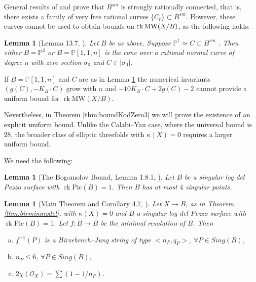 \documentclass[11pt]{amsart}
\newtheorem{lemma}[theorem]{Lemma}
\theoremstyle{definition}
\theoremstyle{definition}
\theoremstyle{remark}
\theoremstyle{remark}
\theoremstyle{definition}
\theoremstyle{conjecture}
\newcommand{\MW}{\mathrm{MW}}
\newcommand{\Pic}{\mathrm{Pic}}
\begin{document}
 
General results of \cite[Thm. 6.5]{XuSRC2012}  and \cite[Lemma 13.7]{KeelMcKernan1999} prove that $B^{sm}$ is strongly rationally connected, that is,  there  exists a family of very free rational curves $\{C_t\}  \subset  B^{sm}$.
However, these curves  cannot be used to obtain bounds on ${\rm rk}\, \MW(X/B)$, as  the following holds:
\begin{lemma}[Lemma 13.7, \cite{KeelMcKernan1999}]\label{lemma:KeelMcK} Let $B$ be as above.
    Suppose $\mathbb{P}^1 \simeq C \subset B^{sm}$%
    . Then either $B=\mathbb{P}^2$ or $B=\mathbb{P}[1,1, n]$ is the cone over a rational normal curve of degree $n$ with zero section $\sigma_0$
    and $C  \in | 
    \sigma_0|$.
\end{lemma}
If  $B=\mathbb{P}[1,1, n]$ and $C$ are  as in Lemma \ref{lemma:KeelMcK} the numerical invariants 
${(g(C), -K_B \cdot C)}$ grow with $n$ and  $-10K_B \cdot C + 2g(C)-2$  cannot provide a uniform bound for $\operatorname{rk}\MW(X/B)$.

\smallskip

Nevertheless, in    Theorem \ref{thm:boundKodZero3} we will   prove the existence of an explicit uniform bound.
 Unlike the Calabi–Yau case, where the universal bound is $28$, the broader class of elliptic threefolds with $\kappa (X)=0$ requires a larger uniform bound. 




We need the following:

\begin{lemma}[The Bogomolov Bound, Lemma 1.8.1, \cite{KeelMcKernan1999}]\label{lemma:bog} Let $B$ be a  singular log del Pezzo surface  with $\operatorname{rk}{\Pic}(B)=1$. Then $B$ has at most $4$ singular points.
\end{lemma}
\begin{lemma}[Main Theorem and Corollary 4.7, \cite{GrassiSingBase1993}]\label{lemma:SingsBaseK0} Let $X \to B$, as in Theorem \ref{thm:birminmodel}, with $\kappa(X)=0$ and  
 $B$  a  singular log del Pezzo surface with $\operatorname{rk}{\Pic}(B)=1$. 
Let 
$f:\widetilde B\rightarrow B$ be 
the minimal resolution of $B$. Then
\begin{enumerate}[(a)]
    \item  $f^{-1}(P)$ is a Hirzebruch--Jung string of type
$<n_P,q_P>$,  $\forall P \in Sing(B)$,
\item 
$n_P\le 6$, $\forall P \in Sing(B)$,
\item
$2 \chi(\mathcal O_X)=
\sum (1-1/n_P)$.
\end{enumerate}   
\end{lemma}
\end{document}
